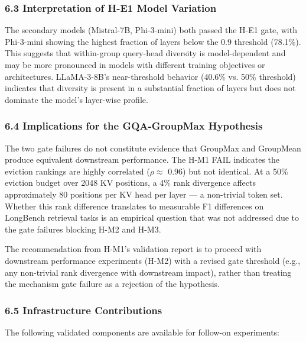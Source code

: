 \subsubsection{6.3 Interpretation of H-E1 Model Variation}

The secondary models (Mistral-7B, Phi-3-mini) both passed the H-E1 gate, with Phi-3-mini showing the highest fraction of layers below the 0.9 threshold (78.1\%). This suggests that within-group query-head diversity is model-dependent and may be more pronounced in models with different training objectives or architectures. LLaMA-3-8B's near-threshold behavior (40.6\% vs. 50\% threshold) indicates that diversity is present in a substantial fraction of layers but does not dominate the model's layer-wise profile.

\subsubsection{6.4 Implications for the GQA-GroupMax Hypothesis}

The two gate failures do not constitute evidence that GroupMax and GroupMean produce equivalent downstream performance. The H-M1 FAIL indicates the eviction rankings are highly correlated ($\rho \approx$ 0.96) but not identical. At a 50\% eviction budget over 2048 KV positions, a 4\% rank divergence affects approximately 80 positions per KV head per layer --- a non-trivial token set. Whether this rank difference translates to measurable F1 differences on LongBench retrieval tasks is an empirical question that was not addressed due to the gate failures blocking H-M2 and H-M3.

The recommendation from H-M1's validation report is to proceed with downstream performance experiments (H-M2) with a revised gate threshold (e.g., any non-trivial rank divergence with downstream impact), rather than treating the mechanism gate failure as a rejection of the hypothesis.

\subsubsection{6.5 Infrastructure Contributions}

The following validated components are available for follow-on experiments:

